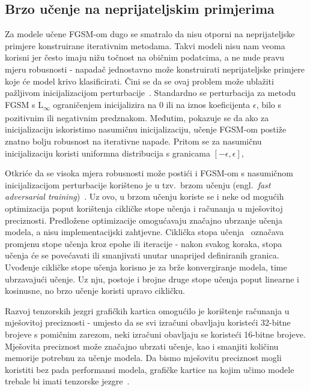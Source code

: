 \documentclass[times, utf8, zavrsni, numeric]{fer}
\begin{document}
\subsection{Brzo učenje na neprijateljskim primjerima}

Za modele učene FGSM-om dugo se smatralo da nisu otporni na neprijateljske primjere konstruirane iterativnim metodama.
Takvi modeli nisu nam veoma korisni jer često imaju nižu točnost na običnim podatcima, a ne nude pravu mjeru robusnosti - napadač jednostavno može konstruirati neprijateljske primjere koje će model krivo klasificirati.
Čini se da se ovaj problem može ublažiti pažljivom inicijalizacijom perturbacije~\cite{wong2020fast}.
Standardno se perturbacija za metodu FGSM s L\textsubscript{$\infty$} ograničenjem inicijalizira na 0 ili na iznos koeficijenta $\epsilon$, bilo s pozitivnim ili negativnim predznakom.
Međutim, pokazuje se da ako za inicijalizaciju iskoristimo nasumičnu inicijalizaciju, učenje FGSM-om postiže znatno bolju robusnost na iterativne napade.
Pritom se za nasumičnu inicijalizaciju koristi uniformna distribucija s granicama $[-\epsilon, \epsilon]$,

Otkriće da se visoka mjera robusnosti može postići i FGSM-om s nasumičnom inicijalizacijom perturbacije korišteno je u tzv.\ brzom učenju (engl.\ \textit{fast adversarial training})~\cite{wong2020fast}.
Uz ovo, u brzom učenju koriste se i neke od mogućih optimizacija poput korištenja cikličke stope učenja i računanja u mješovitoj preciznosti.
Predložene optimizacije omogućavaju značajno ubrzanje učenja modela, a nisu implementacijski zahtjevne.
Ciklička stopa učenja~\cite{smith2017cyclical} označava promjenu stope učenja kroz epohe ili iteracije - nakon svakog koraka, stopa učenja će se povećavati ili smanjivati unutar unaprijed definiranih granica.
Uvođenje cikličke stope učenja korisno je za brže konvergiranje modela, time ubrzavajući učenje. 
Uz nju, postoje i brojne druge stope učenja poput linearne i kosinusne, no brzo učenje koristi upravo cikličku.

Razvoj tenzorskih jezgri grafičkih kartica omogućilo je korištenje računanja u mješovitoj preciznosti - 
umjesto da se svi izračuni obavljaju koristeći 32-bitne brojeve s pomičnim zarezom, neki izračuni obavljaju se koristeći 16-bitne brojeve.
Mješovita preciznost može značajno ubrzati učenje, kao i smanjiti količinu memorije potrebnu za učenje modela.
Da bismo mješovitu preciznost mogli koristiti bez pada performansi modela, grafičke kartice na kojim učimo modele trebale bi imati tenzorske jezgre~\cite{micikevicius2017mixed}.
\end{document}
